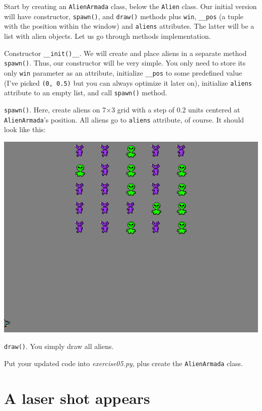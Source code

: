 \documentclass[
]{book}
\begin{document}
Start by creating an \texttt{AlienArmada} class, below the \texttt{Alien} class. Our initial version will have constructor, \texttt{spawn()}, and \texttt{draw()} methods plus \texttt{win}, \texttt{\_\_pos} (a tuple with the position within the window) and \texttt{aliens} attributes. The latter will be a list with alien objects. Let us go through methods implementation.

Constructor \texttt{\_\_init()\_\_}. We will create and place aliens in a separate method \texttt{spawn()}. Thus, our constructor will be very simple. You only need to store its only \texttt{win} parameter as an attribute, initialize \texttt{\_\_pos} to some predefined value (I've picked \texttt{(0,\ 0.5)} but you can always optimize it later on), initialize \texttt{aliens} attribute to an empty list, and call \texttt{spawn()} method.

\texttt{spawn()}. Here, create aliens on 7×3 grid with a step of 0.2 units centered at \texttt{AlienArmada}'s position. All aliens go to \texttt{aliens} attribute, of course. It should look like this:

\includegraphics[width=8.89in]{images/alien-armada}

\texttt{draw()}. You simply draw all aliens.

Put your updated code into \emph{exercise05.py}, plus create the \texttt{AlienArmada} class.

\hypertarget{a-laser-shot-appears}{%
\section{A laser shot appears}\label{a-laser-shot-appears}}
\end{document}
